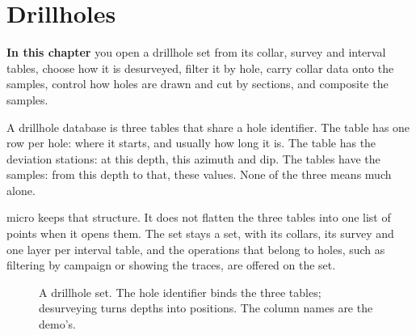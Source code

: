 \chapter{Drillholes}\label{ch:drillholes}
\begin{goals}
\textbf{In this chapter} you open a drillhole set from its collar, survey and interval tables, choose how it is desurveyed, filter it by hole, carry collar data onto the samples, control how holes are drawn and cut by sections, and composite the samples.
\end{goals}

A drillhole database is three tables that share a hole identifier. The  table has one row per hole: where it starts, and usually how long it is. The  table has the deviation stations: at this depth, this azimuth and dip. The  tables have the samples: from this depth to that, these values. None of the three means much alone.

micro keeps that structure. It does not flatten the three tables into one list of points when it opens them. The set stays a set, with its collars, its survey and one layer per interval table, and the operations that belong to holes, such as filtering by campaign or showing the traces, are offered on the set.

\begin{figure}[htbp]\centering
{}
\caption{A drillhole set. The hole identifier binds the three tables; desurveying turns depths into positions. The column names are the demo's.}\label{fig:dh-tables}
\end{figure}

